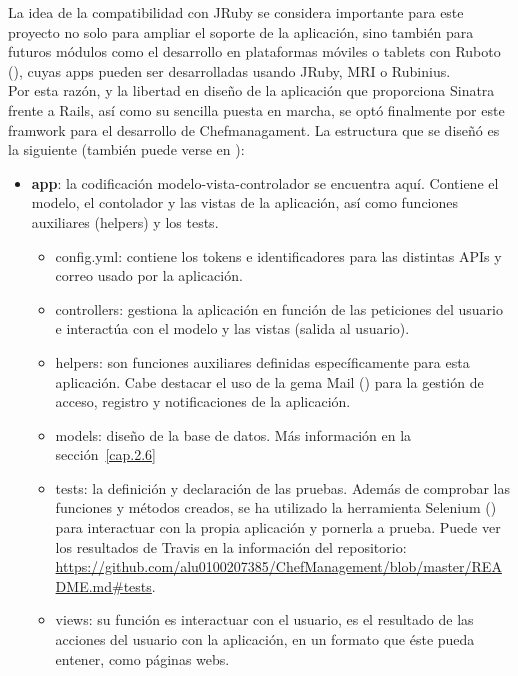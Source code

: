 La idea de la compatibilidad con JRuby se considera importante para este proyecto no solo para ampliar el soporte de la aplicación, sino también para futuros módulos como el desarrollo en plataformas móviles o tablets con Ruboto (\cite{URL:Ruboto}), cuyas apps pueden ser desarrolladas usando JRuby, MRI o Rubinius. \\

Por esta razón, y la libertad en diseño de la aplicación que proporciona Sinatra frente a Rails, así como su sencilla puesta en marcha, se optó finalmente por este framwork para el desarrollo de Chefmanagament. La estructura que se diseñó es la siguiente (también puede verse en \cite{URL:GitHub}):

\begin{itemize}
	\item \textbf{app}: la codificación modelo-vista-controlador se encuentra aquí. Contiene el modelo, el contolador y las vistas de la aplicación, así como funciones auxiliares (helpers) y los tests.
		\begin{itemize}
			\item config.yml: contiene los tokens e identificadores para las distintas APIs y correo usado por la aplicación.
			\item controllers: gestiona la aplicación en función de las peticiones del usuario e interactúa con el modelo y las vistas (salida al usuario).
			\item helpers: son funciones auxiliares definidas específicamente para esta aplicación. Cabe destacar el uso de la gema Mail (\cite{URL:Gema_mail}) para la gestión de acceso, registro y notificaciones de la aplicación.
			\item models: diseño de la base de datos. Más información en la sección~\ref{cap.2.6}
			\item tests: la definición y declaración de las pruebas. Además de comprobar las funciones y métodos creados, se ha utilizado la herramienta Selenium (\cite{URL:Selenium}) para interactuar con la propia aplicación y pornerla a prueba. Puede ver los resultados de Travis en la información del repositorio:
			\\ \href{https://github.com/alu0100207385/ChefManagement/blob/master/README.md#tests}{https://github.com/alu0100207385/ChefManagement/blob/master/README.md\#tests}.
			\item views: su función es interactuar con el usuario, es el resultado de las acciones del usuario con la aplicación, en un formato que éste pueda entener, como páginas webs.

\end{itemize}
\end{itemize}
